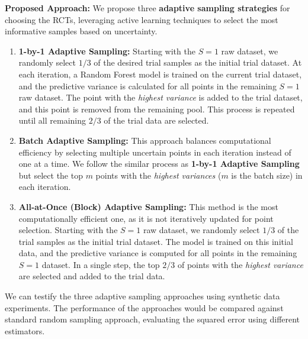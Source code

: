 \documentclass[12pt, oneside]{amsart}
\theoremstyle{definition}
\theoremstyle{remark}
\numberwithin{equation}{section}
\begin{document}
\textbf{Proposed Approach:} We propose three \textbf{adaptive sampling strategies} for choosing the RCTs, leveraging active learning techniques to select the most informative samples based on uncertainty.
\begin{enumerate}
    \item \textbf{1-by-1 Adaptive Sampling:} Starting with the $S = 1$ raw dataset, we randomly select $1/3$ of the desired trial samples as the initial trial dataset. At each iteration, a Random Forest model is trained on the current trial dataset, and the predictive variance is calculated for all points in the remaining $S = 1$ raw dataset. The point with the \textit{highest variance} is added to the trial dataset, and this point is removed from the remaining pool. This process is repeated until all remaining $2/3$ of the trial data are selected.

    \item \textbf{Batch Adaptive Sampling:} This approach balances computational efficiency by selecting multiple uncertain points in each iteration instead of one at a time. We follow the similar process as \textbf{1-by-1 Adaptive Sampling} but select the top $m$ points with the \textit{highest variances} ($m$ is the batch size) in each iteration.

    \item \textbf{All-at-Once (Block) Adaptive Sampling:} This method is the most computationally efficient one, as it is not iteratively updated for point selection. Starting with the $S = 1$ raw dataset, we randomly select $1/3$ of the trial samples as the initial trial dataset. The model is trained on this initial data, and the predictive variance is computed for all points in the remaining $S = 1$ dataset. In a single step, the top $2/3$ of points with the \textit{highest variance} are selected and added to the trial data.
\end{enumerate}

We can testify the three adaptive sampling approaches using synthetic data experiments. The performance of the approaches would be compared against standard random sampling approach, evaluating the squared error using different estimators.
\end{document}
